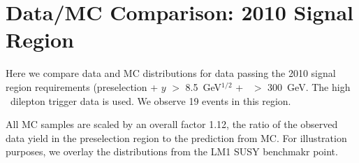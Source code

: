 \section{Data/MC Comparison: 2010 Signal Region}
\label{sec:appendix_datamc_sig}
Here we compare data and MC distributions for data passing the 
2010 signal region requirements (preselection + $y$ $>$ 8.5~GeV$^{1/2}$
+ \Ht\ $>$ 300~GeV. The high \pt\ dilepton trigger
data is used. We observe 19 events in this region.

All MC samples are scaled by an overall factor 1.12,
the ratio of the observed data yield in the preselection region to the
prediction from MC.
For illustration purposes, we overlay the distributions from the LM1
SUSY benchmakr point.

\clearpage

